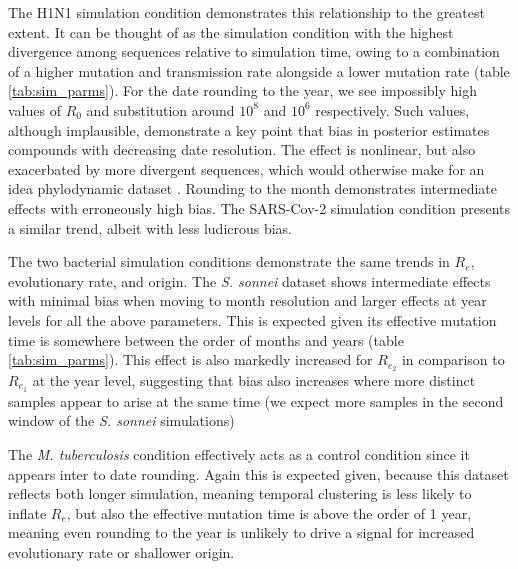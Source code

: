\documentclass{article}
\begin{document}
\begin{spacing}{1.5}
The H1N1 simulation condition demonstrates this relationship to the greatest extent. It can be thought of as the simulation condition with the highest divergence among sequences relative to simulation time, owing to a combination of a higher mutation and transmission rate alongside a lower mutation rate (table \ref{tab:sim_parms}). For the date rounding to the year, we see impossibly high values of $R_0$ and substitution around $10^{8}$ and $10^{6}$ respectively. Such values, although implausible, demonstrate a key point that bias in posterior estimates compounds with decreasing date resolution. The effect is nonlinear, but also exacerbated by more divergent sequences, which would otherwise make for an idea phylodynamic dataset \citep{featherstone_decoding_2023}. Rounding to the month demonstrates intermediate effects with erroneously high bias. The SARS-Cov-2 simulation condition presents a similar trend, albeit with less ludicrous bias. 

The two bacterial simulation conditions demonstrate the same trends in $R_e$, evolutionary rate, and origin. The \textit{S. sonnei} dataset shows intermediate effects with minimal bias when moving to month resolution and larger effects at year levels for all the above parameters. This is expected given its effective mutation time is somewhere between the order of months and years (table \ref{tab:sim_parms}). This effect is also markedly increased for $R_{e_2}$ in comparison to $R_{e_1}$ at the year level, suggesting that bias also increases where more distinct samples appear to arise at the same time (we expect more samples in the second window of the \textit{S. sonnei} simulations)

The \textit{M. tuberculosis} condition effectively acts as a control condition since it appears inter to date rounding. Again this is expected given, because this dataset reflects both longer simulation, meaning temporal clustering is less likely to inflate $R_e$, but also the effective mutation time is above the order of 1 year, meaning even rounding to the year is unlikely to drive a signal for increased evolutionary rate or shallower origin.



\end{spacing}
\end{document}
